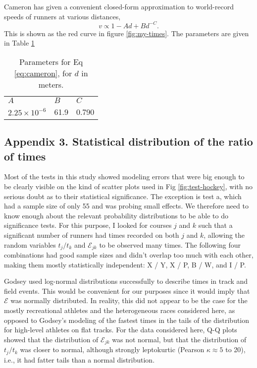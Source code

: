 \documentclass[10pt,letterpaper]{article}
\begin{document}
Cameron\cite{cameron} has given a
convenient closed-form approximation to world-record speeds of runners at various distances,
\begin{equation}\label{eq:cameron}
  v\propto 1-Ad+Bd^{-C}.
\end{equation}
This is shown as the red curve in figure \ref{fig:my-times}. The parameters are given in Table \ref{table:cameron-parameters}

\begin{table}[h]
\caption{Parameters for Eq \eqref{eq:cameron}, for $d$ in meters.}
\begin{tabular}{lll}
$A$ & $B$ & $C$ \\
$2.25\times10^{-6}$ & 61.9 & 0.790
\end{tabular}
\label{table:cameron-parameters}
\end{table}



\subsection*{Appendix 3. Statistical distribution of the ratio of times}

Most of the tests in this study showed modeling errors that were big enough to be clearly
visible on the kind of scatter plots used in Fig \ref{fig:test-hockey}, with no serious doubt
as to their statistical significance. The exception is test a, which had a sample size of
only 55 and was probing small effects. We therefore need to know enough about the relevant probability distributions to
be able to do significance tests. For this purpose, I looked for courses $j$ and $k$ such
that a significant number of runners had times recorded on both $j$ and $k$, allowing
the random variables $t_j/t_k$ and $\mathcal{E}_{jk}$ to be observed many times. The following four
combinations had good sample sizes and didn't overlap too much with each other, making them
mostly statistically independent: X / Y, X / P, B / W, and I / P.

Godsey\cite{godsey} used log-normal distributions successfully to describe times in track and
field events. This would be convenient for our purposes since it would imply that $\mathcal{E}$
was normally distributed. In reality, this did not appear to be the case for the mostly recreational
athletes and the heterogeneous races considered here, as opposed to Godsey's modeling of
the fastest times in the tails of the distribution for high-level athletes on flat tracks. For the data considered here,
Q-Q plots showed that the distribution of $\mathcal{E}_{jk}$ was not normal, but that
the distribution of $t_j/t_k$ was closer to normal, although strongly leptokurtic
(Pearson $\kappa\approx 5$ to 20), i.e., it had fatter tails than a normal distribution.
\end{document}
